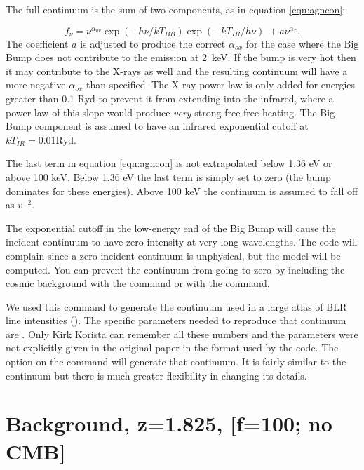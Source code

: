 The full continuum is the sum of two components,
as in equation \ref{eqn:agncon}:

\begin{equation}
\label{eqn:agncon}
f_\nu   = \nu ^{\alpha _{uv} } \exp \left( { - h\nu /kT_{BB} } \right)\exp
\left( { - kT_{IR} /h\nu } \right)\; + a\nu ^{\alpha _x }. %
\end{equation}
The coefficient $a$ is adjusted to produce the
correct $\alpha_{ox}$ for the case where
the Big Bump does not contribute to the emission at 2~keV.
If the bump
is very hot then it may contribute to the X-rays as well and
the resulting
continuum will have a more negative $\alpha_{ox}$ than specified.
The X-ray power
law is only added for energies greater than 0.1 Ryd to prevent
it from
extending into the infrared, where a power law of this slope
would produce
\emph{very} strong free-free heating.
The Big Bump component is assumed to have
an infrared exponential cutoff at $kT_{IR} = 0.01 \mathrm{Ryd}$.

The last term in equation \ref{eqn:agncon} is not extrapolated
below 1.36 eV or above 100 keV.
Below 1.36 eV the last term is simply set to zero (the bump
dominates for these energies).
Above 100 keV the continuum is assumed to
fall off as $v^{-2}$.

The exponential cutoff in the low-energy end of the Big Bump will cause
the incident continuum to have zero intensity at very long wavelengths.
The code will complain since a zero incident continuum is unphysical, but
the model will be computed.
You can prevent the continuum from going to
zero by including the cosmic background with the
 command or with the  command.

We used this command to generate the continuum used in a large atlas
of BLR line intensities (\citealp{KoristaBaldwin1997}).
The specific parameters
needed to reproduce that continuum are
.  Only
Kirk Korista can remember all these numbers and the parameters were not
explicitly given in the original paper in the format used by the code.
The  option on the  command will
generate that continuum.
It is fairly
similar to the \citet{Mathews1987} continuum but there is
much greater
flexibility in changing its details.

\section{Background, z=1.825, [f=100; no CMB]}

